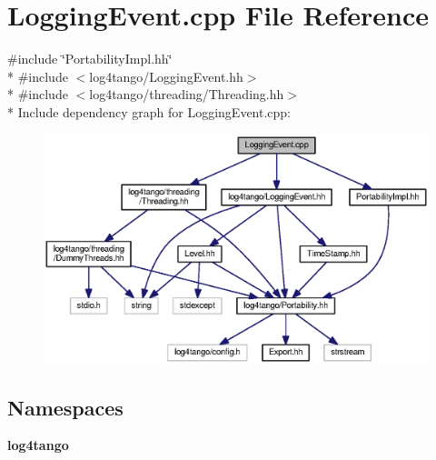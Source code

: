 \section{Logging\-Event.\-cpp File Reference}
\label{LoggingEvent_8cpp}
{\ttfamily \#include \char`\"{}Portability\-Impl.\-hh\char`\"{}}\\*
{\ttfamily \#include $<$log4tango/\-Logging\-Event.\-hh$>$}\\*
{\ttfamily \#include $<$log4tango/threading/\-Threading.\-hh$>$}\\*
Include dependency graph for Logging\-Event.\-cpp\-:
\nopagebreak
\begin{figure}[H]
\begin{center}
\leavevmode
\includegraphics[width=350pt]{d6/dd2/LoggingEvent_8cpp__incl}
\end{center}
\end{figure}
\subsection*{Namespaces}
\begin{DoxyCompactItemize}
\item 
{\bf log4tango}
\end{DoxyCompactItemize}

